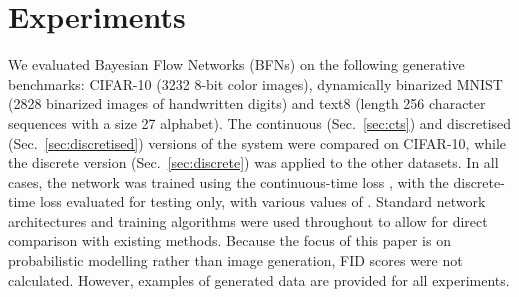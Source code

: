 \documentclass[11pt,table]{article}
\newcommand{\0}[1]{\constvec{0}{#1}}
\newcommand{\1}[1]{\constvec{1}{#1}}
\begin{document}
\section{Experiments}\label{sec:experiments}
We evaluated Bayesian Flow Networks (BFNs) on the following generative benchmarks: CIFAR-10 (3232 8-bit color images), dynamically binarized MNIST (2828 binarized images of handwritten digits) and text8 (length 256 character sequences with a size 27 alphabet).
The continuous (Sec.~\ref{sec:cts}) and discretised (Sec.~\ref{sec:discretised}) versions of the system were compared on CIFAR-10, while the discrete version (Sec.~\ref{sec:discrete}) was applied to the other datasets.
In all cases, the network was trained using the continuous-time loss , with the discrete-time loss  evaluated for testing only, with various values of .
Standard network architectures and training algorithms were used throughout to allow for direct comparison with existing methods.
Because the focus of this paper is on probabilistic modelling rather than image generation, FID scores were not calculated. However, examples of generated data are provided for all experiments.
\end{document}
